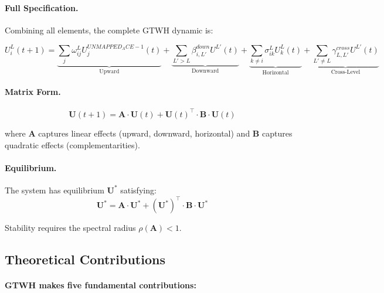 \paragraph{Full Specification.}
Combining all elements, the complete GTWH dynamic is:

\begin{tcolorbox}[colback=blue!5!white, colframe=blue!75!black, title=The GTWH Master Equation]
\begin{equation}
\boxed{
U^L_i(t+1) = \underbrace{\sum_{j} \omega^L_{ij} U^{UNMAPPED_ACE-1}_j(t)}_{\text{Upward}} + 
\underbrace{\sum_{L'>L} \beta^{down}_{i,L'} U^{L'}(t)}_{\text{Downward}} + 
\underbrace{\sum_{k \neq i} \sigma^L_{ik} U^L_k(t)}_{\text{Horizontal}} + 
\underbrace{\sum_{L' \neq L} \gamma^{cross}_{L,L'} U^{L'}(t)}_{\text{Cross-Level}}
}
\end{equation}
\end{tcolorbox}

\paragraph{Matrix Form.}
\begin{equation}
\mathbf{U}(t+1) = \mathbf{A} \cdot \mathbf{U}(t) + \mathbf{U}(t)^\top \cdot \mathbf{B} \cdot \mathbf{U}(t)
\end{equation}

where $\mathbf{A}$ captures linear effects (upward, downward, horizontal) and 
$\mathbf{B}$ captures quadratic effects (complementarities).

\paragraph{Equilibrium.}
The system has equilibrium $\mathbf{U}^*$ satisfying:
\begin{equation}
\mathbf{U}^* = \mathbf{A} \cdot \mathbf{U}^* + (\mathbf{U}^*)^\top \cdot \mathbf{B} \cdot \mathbf{U}^*
\end{equation}

Stability requires the spectral radius $\rho(\mathbf{A}) < 1$.

\subsection{Theoretical Contributions}

\paragraph{GTWH makes five fundamental contributions:}

